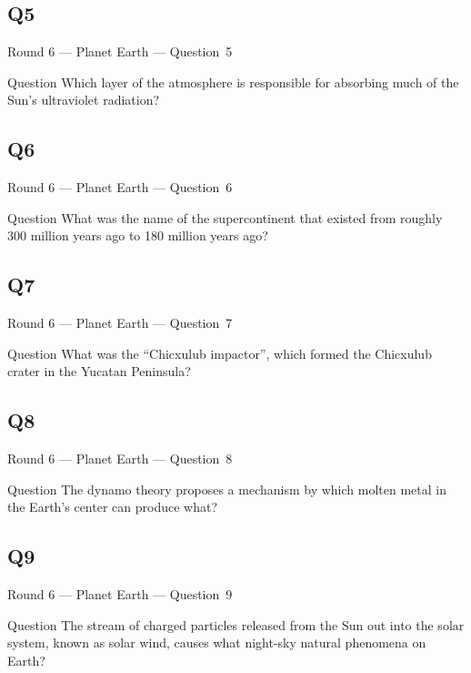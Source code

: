 \documentclass[11pt]{beamer}
\begin{document}
\subsection*{Q5}
\begin{frame}[t]{Round 6 --- Planet Earth --- \mbox{Question 5}}
\vspace{-0.5em}
\begin{block}{Question}
Which layer of the atmosphere is responsible for absorbing much of the Sun's ultraviolet radiation?
\end{block}
\end{frame}
\subsection*{Q6}
\begin{frame}[t]{Round 6 --- Planet Earth --- \mbox{Question 6}}
\vspace{-0.5em}
\begin{block}{Question}
What was the name of the supercontinent that existed from roughly 300 million years ago to 180 million years ago?
\end{block}
\end{frame}
\subsection*{Q7}
\begin{frame}[t]{Round 6 --- Planet Earth --- \mbox{Question 7}}
\vspace{-0.5em}
\begin{block}{Question}
What was the ``Chicxulub impactor'', which formed the Chicxulub crater in the Yucatan Peninsula?
\end{block}
\end{frame}
\subsection*{Q8}
\begin{frame}[t]{Round 6 --- Planet Earth --- \mbox{Question 8}}
\vspace{-0.5em}
\begin{block}{Question}
The dynamo theory proposes a mechanism by which molten metal in the Earth's center can produce what?
\end{block}
\end{frame}
\subsection*{Q9}
\begin{frame}[t]{Round 6 --- Planet Earth --- \mbox{Question 9}}
\vspace{-0.5em}
\begin{block}{Question}
The stream of charged particles released from the Sun out into the solar system, known as solar wind, causes what night-sky natural phenomena on Earth?
\end{block}
\end{frame}
\end{document}
